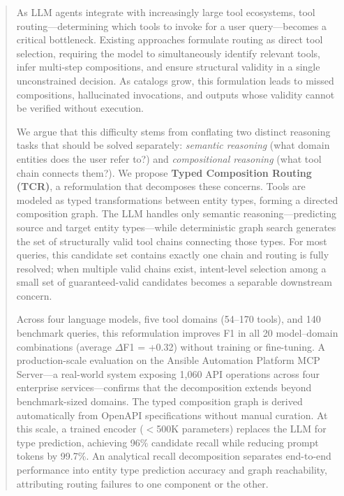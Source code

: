 
\begin{abstract}

As LLM agents integrate with increasingly large tool ecosystems, tool routing---determining which tools to invoke for a user query---becomes a critical bottleneck.
Existing approaches formulate routing as direct tool selection, requiring the model to simultaneously identify relevant tools, infer multi-step compositions, and ensure structural validity in a single unconstrained decision.
As catalogs grow, this formulation leads to missed compositions, hallucinated invocations, and outputs whose validity cannot be verified without execution.

We argue that this difficulty stems from conflating two distinct reasoning tasks that should be solved separately: \emph{semantic reasoning} (what domain entities does the user refer to?) and \emph{compositional reasoning} (what tool chain connects them?).
We propose \textbf{Typed Composition Routing (TCR)}, a reformulation that decomposes these concerns.
Tools are modeled as typed transformations between entity types, forming a directed composition graph.
The LLM handles only semantic reasoning---predicting source and target entity types---while deterministic graph search generates the set of structurally valid tool chains connecting those types.
For most queries, this candidate set contains exactly one chain and routing is fully resolved; when multiple valid chains exist, intent-level selection among a small set of guaranteed-valid candidates becomes a separable downstream concern.

Across four language models, five tool domains (54--170 tools), and 140 benchmark queries, this reformulation improves F1 in all 20 model--domain combinations (average $\Delta$F1 = +0.32) without training or fine-tuning.
A production-scale evaluation on the Ansible Automation Platform MCP Server---a real-world system exposing 1,060 API operations across four enterprise services---confirms that the decomposition extends beyond benchmark-sized domains.
The typed composition graph is derived automatically from OpenAPI specifications without manual curation.
At this scale, a trained encoder ($<$500K parameters) replaces the LLM for type prediction, achieving 96\% candidate recall while reducing prompt tokens by 99.7\%.
An analytical recall decomposition separates end-to-end performance into entity type prediction accuracy and graph reachability, attributing routing failures to one component or the other.

\end{abstract}
